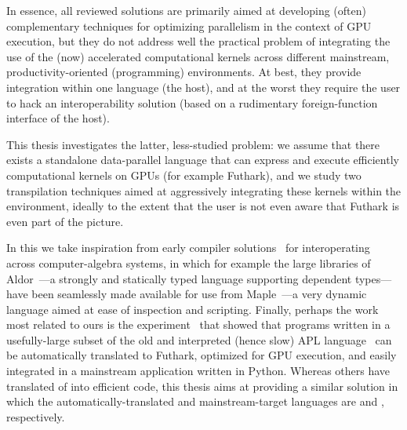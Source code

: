 %

In essence, all reviewed solutions are primarily aimed at developing (often) 
complementary techniques for optimizing parallelism in the context of GPU 
execution, but they do not address well the practical problem of integrating 
the use of the (now) accelerated computational kernels across different 
mainstream, productivity-oriented (programming) environments.
At best, they provide integration within one language (the host), 
and at the worst they require the user to hack an interoperability 
solution (based on a rudimentary foreign-function interface of the host). 


This thesis investigates the latter, less-studied problem: we assume that
there exists a standalone data-parallel language that can express and 
execute efficiently computational kernels on GPUs (for example Futhark), and 
we study two transpilation techniques aimed at aggressively integrating
these kernels within the \fsharp{} environment, ideally to the extent that
the user is not even aware that Futhark is even part of the picture.

In this we take inspiration from early compiler 
solutions~\cite{alma:ISSAC,mapal_synasc} for interoperating
across computer-algebra systems, in which for example
the large libraries of Aldor~\cite{aldor}---a strongly and statically typed 
language supporting dependent types---have been seamlessly made available 
for use from Maple~\cite{maple_guide}---a very dynamic language aimed at 
ease of inspection and scripting.
%
Finally, perhaps the work most related to ours
is the experiment~\cite{apltail} that showed that programs 
written in a usefully-large subset of the old and interpreted (hence slow) APL 
language~\cite{dyalogbook} can be automatically translated to Futhark, 
optimized for GPU execution, and easily integrated in a mainstream application
written in Python. Whereas others have translated of \fsharp{}\cite{Shaikhha} into
efficient \clang{} code, this thesis aims at providing a similar solution in which
the automatically-translated and mainstream-target languages are \fsharp{}
and \csharp{}, respectively.

